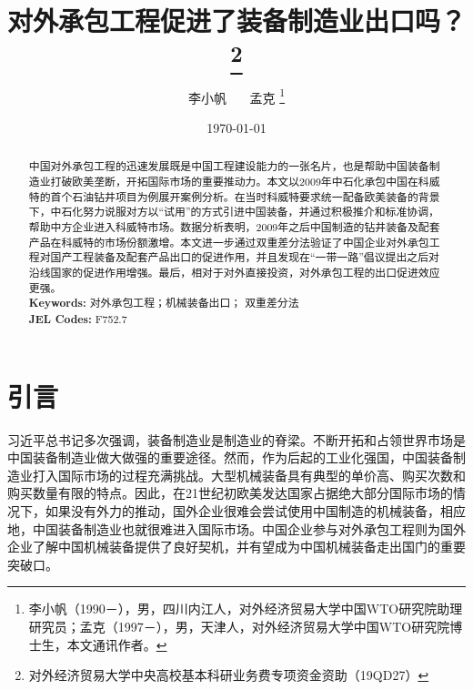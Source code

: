 \documentclass[a4paper,12pt]{article}
\begin{document}

\title{\centering 对外承包工程促进了装备制造业出口吗？ 
	 \thanks{对外经济贸易大学中央高校基本科研业务费专项资金资助（19QD27）} }
\author{\addtocounter{footnote}{1} {\normalsize 李小帆 \ \ \ 孟克} 
	\thanks{李小帆（1990－），男，四川内江人，对外经济贸易大学中国WTO研究院助理研究员；孟克（1997－），男，天津人，对外经济贸易大学中国WTO研究院博士生，本文通讯作者。} \\}
\date{\today}
\maketitle

\begin{abstract}
	中国对外承包工程的迅速发展既是中国工程建设能力的一张名片，也是帮助中国装备制造业打破欧美垄断，开拓国际市场的重要推动力。本文以2009年中石化承包中国在科威特的首个石油钻井项目为例展开案例分析。在当时科威特要求统一配备欧美装备的背景下，中石化努力说服对方以“试用”的方式引进中国装备，并通过积极推介和标准协调，帮助中方企业进入科威特市场。数据分析表明，2009年之后中国制造的钻井装备及配套产品在科威特的市场份额激增。本文进一步通过双重差分法验证了中国企业对外承包工程对国产工程装备及配套产品出口的促进作用，并且发现在“一带一路”倡议提出之后对沿线国家的促进作用增强。最后，相对于对外直接投资，对外承包工程的出口促进效应更强。 \\
	\medskip
	\textbf{Keywords:} 对外承包工程；机械装备出口； 双重差分法 \\
	\textbf{JEL Codes: }F752.7
\end{abstract}

\bigskip

\newpage	


\section{引言}
习近平总书记多次强调，装备制造业是制造业的脊梁。不断开拓和占领世界市场是中国装备制造业做大做强的重要途径。然而，作为后起的工业化强国，中国装备制造业打入国际市场的过程充满挑战。大型机械装备具有典型的单价高、购买次数和购买数量有限的特点。因此，在21世纪初欧美发达国家占据绝大部分国际市场的情况下，如果没有外力的推动，国外企业很难会尝试使用中国制造的机械装备，相应地，中国装备制造业也就很难进入国际市场。中国企业参与对外承包工程则为国外企业了解中国机械装备提供了良好契机，并有望成为中国机械装备走出国门的重要突破口。

	\vspace{0.5em}  %
\end{document}
